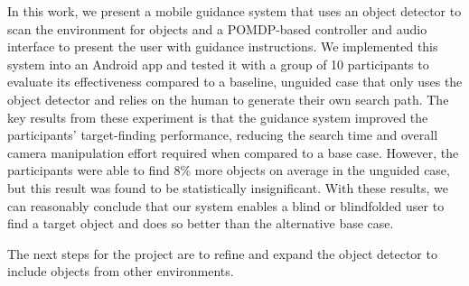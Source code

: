 \documentclass[runningheads]{llncs}
\begin{document}
In this work, we present a mobile guidance system that uses an object detector to scan the environment for objects and a POMDP-based controller and audio interface to present the user with guidance instructions. 
We implemented this system into an Android app and tested it with a group of 10 participants to evaluate its effectiveness compared to a baseline, unguided case that only uses the object detector and relies on the human to generate their own search path. 
The key results from these experiment is that the guidance system improved the participants' target-finding performance, reducing the search time and overall camera manipulation effort required when compared to a base case.
However, the participants were able to find 8\% more objects on average in the unguided case, but this result was found to be statistically insignificant. 
With these results, we can reasonably conclude that our system enables a blind or blindfolded user to find a target object and does so better than the alternative base case.

The next steps for the project are to refine and expand the object detector to include objects from other environments. 



\end{document}
